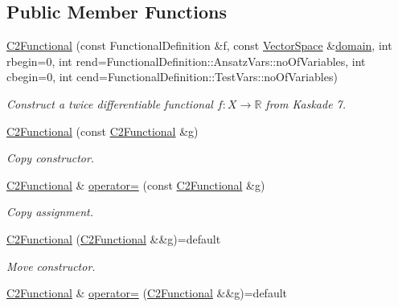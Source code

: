 \subsection*{Public Member Functions}
\begin{DoxyCompactItemize}
\item 
\hyperlink{classSpacy_1_1Kaskade_1_1C2Functional_a35511ed1de0b2599efa901f27793dbdc_a35511ed1de0b2599efa901f27793dbdc}{C2\+Functional} (const Functional\+Definition \&f, const \hyperlink{classSpacy_1_1VectorSpace}{Vector\+Space} \&\hyperlink{classSpacy_1_1C2FunctionalBase_a016d11deb1525e762bdfbe7e54250718_a016d11deb1525e762bdfbe7e54250718}{domain}, int rbegin=0, int rend=Functional\+Definition\+::\+Ansatz\+Vars\+::no\+Of\+Variables, int cbegin=0, int cend=Functional\+Definition\+::\+Test\+Vars\+::no\+Of\+Variables)
\begin{DoxyCompactList}\small\item\em Construct a twice differentiable functional $f: X\rightarrow \mathbb{R}$ from Kaskade 7. \end{DoxyCompactList}\item 
\hyperlink{classSpacy_1_1Kaskade_1_1C2Functional_a3d4246d31cffe9ea79cca4ab7c539ede_a3d4246d31cffe9ea79cca4ab7c539ede}{C2\+Functional} (const \hyperlink{classSpacy_1_1Kaskade_1_1C2Functional}{C2\+Functional} \&g)
\begin{DoxyCompactList}\small\item\em Copy constructor. \end{DoxyCompactList}\item 
\hyperlink{classSpacy_1_1Kaskade_1_1C2Functional}{C2\+Functional} \& \hyperlink{classSpacy_1_1Kaskade_1_1C2Functional_a1e24c0959890ba4caf0531cf47f3bee5_a1e24c0959890ba4caf0531cf47f3bee5}{operator=} (const \hyperlink{classSpacy_1_1Kaskade_1_1C2Functional}{C2\+Functional} \&g)
\begin{DoxyCompactList}\small\item\em Copy assignment. \end{DoxyCompactList}\item 
\hyperlink{classSpacy_1_1Kaskade_1_1C2Functional_adf3cb62771e39a351db349005ec6bc36_adf3cb62771e39a351db349005ec6bc36}{C2\+Functional} (\hyperlink{classSpacy_1_1Kaskade_1_1C2Functional}{C2\+Functional} \&\&g)=default
\begin{DoxyCompactList}\small\item\em Move constructor. \end{DoxyCompactList}\item 
\hyperlink{classSpacy_1_1Kaskade_1_1C2Functional}{C2\+Functional} \& \hyperlink{classSpacy_1_1Kaskade_1_1C2Functional_a2cabb743e80fa24c22ef0ac358159323_a2cabb743e80fa24c22ef0ac358159323}{operator=} (\hyperlink{classSpacy_1_1Kaskade_1_1C2Functional}{C2\+Functional} \&\&g)=default

\end{DoxyCompactItemize}
